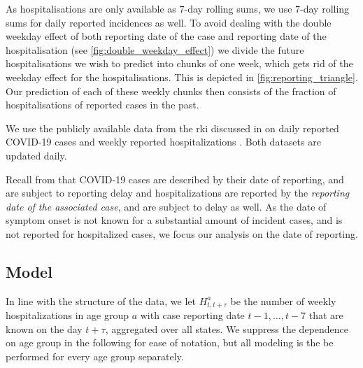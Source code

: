 As hospitalisations are only available as \(7\)-day rolling sums, we use \(7\)-day rolling sums for daily reported incidences as well. To avoid dealing with the double weekday effect of both reporting date of the case and reporting date of the hospitalisation (see \cref{fig:double_weekday_effect}) we divide the future hospitalisations we wish to predict into chunks of one week, which gets rid of the weekday effect for the hospitalisations. This is depicted in \cref{fig:reporting_triangle}. Our prediction of each of these weekly chunks then consists of the fraction of hospitalisations of reported cases in the past.

We use the publicly available data from the \acrshort{rki} discussed in  on daily reported COVID-19 cases \citep{RobertKoch-Institut2024SARSCoV2} and weekly reported hospitalizations \citep{RobertKoch-Institut2024COVID19Hospitalisierungen}. Both datasets are updated daily.

Recall from  that COVID-19 cases are described by their date of reporting, and are subject to reporting delay and hospitalizations are reported by the \textit{reporting date of the associated case}, and are subject to delay as well. As the date of symptom onset is not known for a substantial amount of incident cases, and is not reported for hospitalized cases, we focus our analysis on the date of reporting.


\begin{figure}
    \resizebox{\textwidth}{!}{%
    }
    \caption{}
    \label{fig:delay_hospitalization_probabilities}
\end{figure}

\subsection{Model}
In line with the structure of the data, we let $H^a_{t,t + \tau}$ be the number of weekly hospitalizations in age group $a$ with case reporting date $t - 1, \dots, t - 7$ that are known on the day $t + \tau$, aggregated over all states. We suppress the dependence on age group in the following for ease of notation, but all modeling is the be performed for every age group separately.

